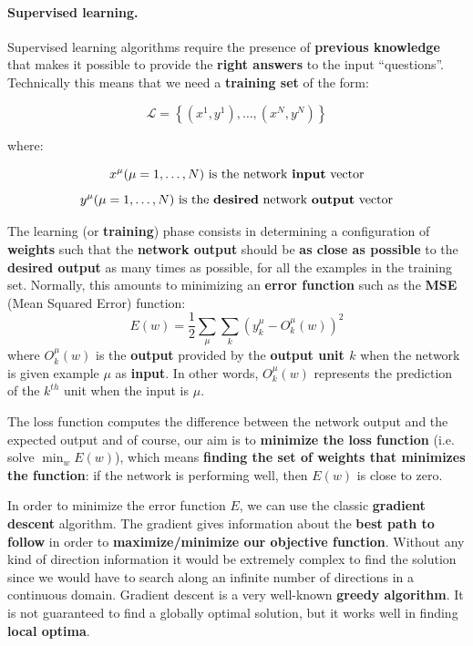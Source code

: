 
\paragraph*{Supervised learning.} Supervised learning algorithms require the presence of \textbf{previous knowledge} that makes it possible to provide the \textbf{right answers} to the input ``questions''. Technically this means that we need a \textbf{training set} of the form:

$$
\mathcal{L} =\left\{\left(x^1, y^1 \right), \dots , \left(x^N, y ^N \right) \right\}
$$

where:

$$x^\mu (\mu=1,\dots, N) \text{ is the network \textbf{input} vector}$$
$$y^\mu (\mu=1,\dots, N) \text{ is the \textbf{desired} network \textbf{output} vector}$$

The learning (or \textbf{training}) phase consists in determining a configuration of \textbf{weights} such that the \textbf{network output} should be \textbf{as close as possible} to the \textbf{desired output} as many times as possible, for all the examples in the training set. Normally, this amounts to minimizing an \textbf{error function} such as the \textbf{MSE} (Mean Squared Error) function:
$$E(w) = \frac{1}{2} \sum_{\mu} \sum_{k} \left(y_k^\mu - O_k^\mu(w)\right)^2$$
where $O_k^\mu(w)$ is the \textbf{output} provided by the \textbf{output unit $k$} when the network is given example $\mu$ as \textbf{input}. In other words, $O_k^\mu(w)$ represents the prediction of the $k^{th}$ unit when the input is $\mu$. 

The loss function computes the difference between the network output and the expected output and of course, our aim is to \textbf{minimize the loss function} (i.e. solve $\min_w E(w)$), which means \textbf{finding the set of weights that minimizes the function}: if the network is performing well, then $E(w)$ is close to zero.

In order to minimize the error function $E$, we can use the classic \textbf{gradient descent} algorithm. The gradient gives information about the \textbf{best path to follow} in order to \textbf{maximize/minimize our objective function}. Without any kind of direction information it would be extremely complex to find the solution since we would have to search along an infinite number of directions in a continuous domain. Gradient descent is a very well-known \textbf{greedy algorithm}. It is not guaranteed to find a globally optimal solution, but it works well in finding \textbf{local optima}. 

